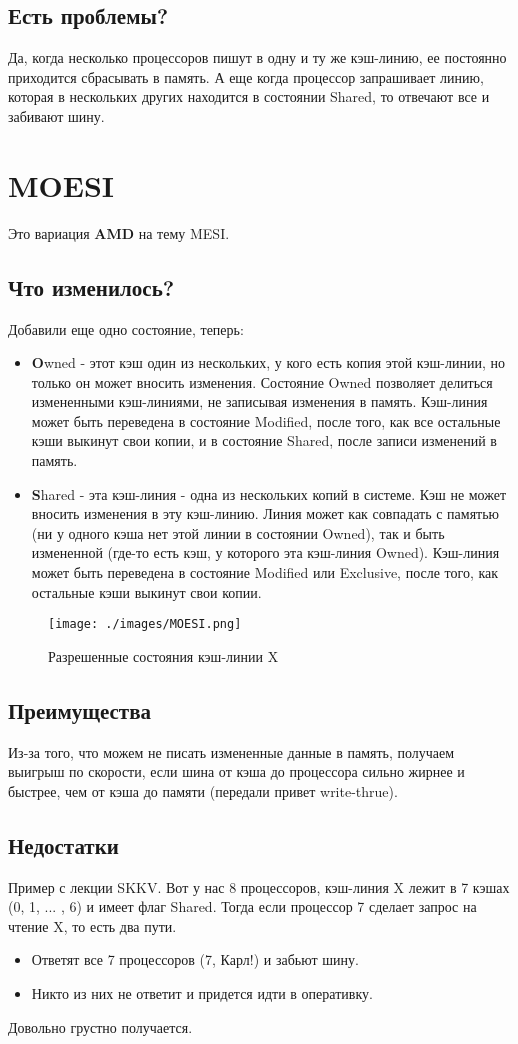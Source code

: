 \documentclass[12pt, a4paper]{article}
\begin{document}
\subsection{Есть проблемы?}
Да, когда несколько процессоров пишут в одну и ту же кэш-линию, ее постоянно приходится сбрасывать в память.
А еще когда процессор запрашивает линию, которая в нескольких других находится в состоянии Shared, то отвечают все и забивают шину.
\section{MOESI}
Это вариация \textbf{AMD} на тему MESI.
\subsection{Что изменилось?}
Добавили еще одно состояние, теперь:
\begin{itemize}
    \item \textbf{O}wned - этот кэш один из нескольких, у кого есть копия этой кэш-линии, но только он может вносить изменения. Состояние Owned позволяет делиться измененными кэш-линиями, не записывая изменения в память. Кэш-линия может быть переведена в состояние Modified, после того, как все остальные кэши выкинут свои копии, и в состояние Shared, после записи изменений в память.
    \item \textbf{S}hared - эта кэш-линия - одна из нескольких копий в системе. Кэш не может вносить изменения в эту кэш-линию. Линия может как совпадать с памятью (ни у одного кэша нет этой линии в состоянии Owned), так и быть измененной (где-то есть кэш, у которого эта кэш-линия Owned). Кэш-линия может быть переведена в состояние Modified или Exclusive, после того, как остальные кэши выкинут свои копии.
\end{itemize}
\begin{figure}[h]
    \centering
    \texttt{[image: ./images/MOESI.png]}
    \caption{Разрешенные состояния кэш-линии X}
    \label{fig:MOESI}
\end{figure}
\subsection{Преимущества}
Из-за того, что можем не писать измененные данные в память, получаем выигрыш по скорости, если шина от кэша до процессора сильно жирнее и быстрее, чем от кэша до памяти (передали привет write-thrue).
\subsection{Недостатки}
Пример с лекции SKKV. Вот у нас 8 процессоров, кэш-линия X лежит в 7 кэшах (0, 1, ... , 6) и имеет флаг Shared. Тогда если процессор 7 сделает запрос на чтение X, то есть два пути.
\begin{itemize}
    \item Ответят все 7 процессоров (7, Карл!) и забьют шину.
    \item Никто из них не ответит и придется идти в оперативку.
\end{itemize}
Довольно грустно получается.
\end{document}
